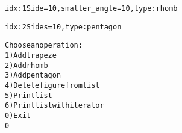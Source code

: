 \begin{alltt}
idx: 1   Side = 10, smaller_angle = 10, type: rhomb

idx: 2   Sides =  10, type: pentagon


Choose an operation:
1) Add trapeze
2) Add rhomb
3) Add pentagon
4) Delete figure from list
5) Print list
6) Print list with iterator
0) Exit
0


\end{alltt}


